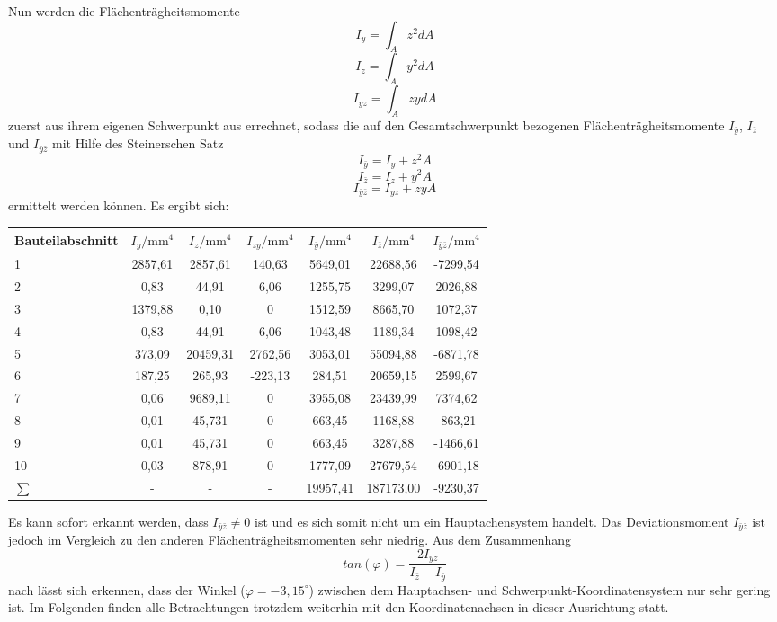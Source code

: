 Nun werden die Flächenträgheitsmomente 
\begin{equation}\label{FT1}
	I_{y} = \int_{A}^{}z^2dA
\end{equation}
\begin{equation}
I_{z} = \int_{A}^{}y^2dA
\end{equation}
\begin{equation}\label{FT3}
I_{yz} = \int_{A}^{}zydA
\end{equation}
 zuerst aus ihrem eigenen Schwerpunkt aus errechnet, sodass die auf den Gesamtschwerpunkt bezogenen Flächenträgheitsmomente $I_{\bar{y}}$, $I_{\bar{z}}$ und $I_{\bar{y}\bar{z}}$ mit Hilfe des Steinerschen Satz
 \begin{equation}
 	I_{\bar{y}} = I_{y} + z^2A
 \end{equation}
\begin{equation}
I_{\bar{z}} = I_{z} + y^2A
\end{equation}
\begin{equation}
I_{\bar{y}\bar{z}} = I_{yz} + zyA
\end{equation}
 ermittelt werden können.
Es ergibt sich:
\begin{center}

\begin{tabular}[h]{l|c|c|c||c|c|c}
Bauteilabschnitt&$I_{y}/\mathrm{mm}^4$&$I_{z}/\mathrm{mm}^4$&$I_{zy}/\mathrm{mm}^4$&$I_{\bar{y}}/\mathrm{mm}^4$&$I_{\bar{z}}/\mathrm{mm}^4$&$I_{\bar{y}\bar{z}}/\mathrm{mm}^4$\\
\hline
1&2857,61&2857,61&140,63&5649,01&22688,56&-7299,54\\
2&0,83&44,91&6,06&1255,75&3299,07&2026,88\\
3&1379,88&0,10&0&1512,59&8665,70&1072,37\\
4&0,83&44,91&6,06&1043,48&1189,34&1098,42\\
5&373,09&20459,31&2762,56&3053,01&55094,88&-6871,78\\
6&187,25&265,93&-223,13&284,51&20659,15&2599,67\\
7&0,06&9689,11&0&3955,08&23439,99&7374,62\\
8&0,01&45,731&0&663,45&1168,88&-863,21\\
9&0,01&45,731&0&663,45&3287,88&-1466,61\\
10&0,03&878,91&0&1777,09&27679,54&-6901,18\\
\hline
$\sum{}$&-&-&-&19957,41&187173,00&-9230,37
\end{tabular}
\end{center}
Es kann sofort erkannt werden, dass $I_{\bar{y}\bar{z}} \neq 0$ ist und es sich somit nicht um ein Hauptachensystem handelt. Das Deviationsmoment  $I_{\bar{y}\bar{z}}$ ist jedoch im Vergleich zu den anderen Flächenträgheitsmomenten sehr niedrig. 
Aus dem Zusammenhang
\begin{equation}
	tan(\varphi)=\frac{2I_{\bar{y}\bar{z}}}{I_{\bar{z}}-I_{\bar{y}}}
\end{equation}
nach \cite{item15} lässt sich erkennen, dass der Winkel ($\varphi =-3,15^\circ$) zwischen dem Hauptachsen- und Schwerpunkt-Koordinatensystem nur sehr gering ist. Im Folgenden finden alle Betrachtungen trotzdem weiterhin mit den Koordinatenachsen in dieser Ausrichtung statt.

